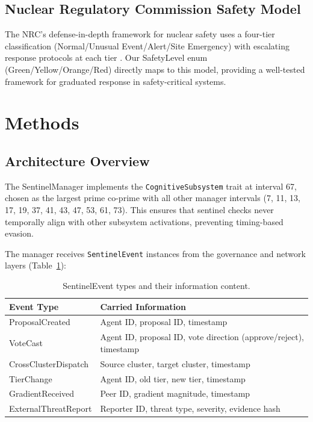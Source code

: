 \documentclass[11pt,a4paper]{article}
\begin{document}
\subsection{Nuclear Regulatory Commission Safety Model}

The NRC's defense-in-depth framework for nuclear safety uses a four-tier classification (Normal/Unusual Event/Alert/Site Emergency) with escalating response protocols at each tier \citep{nrc2011}. Our SafetyLevel enum (Green/Yellow/Orange/Red) directly maps to this model, providing a well-tested framework for graduated response in safety-critical systems.

\section{Methods}

\subsection{Architecture Overview}

The SentinelManager implements the \texttt{CognitiveSubsystem} trait at interval 67, chosen as the largest prime co-prime with all other manager intervals (7, 11, 13, 17, 19, 37, 41, 43, 47, 53, 61, 73). This ensures that sentinel checks never temporally align with other subsystem activations, preventing timing-based evasion.

The manager receives \texttt{SentinelEvent} instances from the governance and network layers (Table~\ref{tab:sentinel_events}):

\begin{table}[h]
\centering
\caption{SentinelEvent types and their information content.}
\label{tab:sentinel_events}
\begin{tabular}{p{3.5cm}p{7.5cm}}
\toprule
\textbf{Event Type} & \textbf{Carried Information} \\
\midrule
ProposalCreated & Agent ID, proposal ID, timestamp \\
VoteCast & Agent ID, proposal ID, vote direction (approve/reject), timestamp \\
CrossClusterDispatch & Source cluster, target cluster, timestamp \\
TierChange & Agent ID, old tier, new tier, timestamp \\
GradientReceived & Peer ID, gradient magnitude, timestamp \\
ExternalThreatReport & Reporter ID, threat type, severity, evidence hash \\
\bottomrule
\end{tabular}
\end{table}
\end{document}
